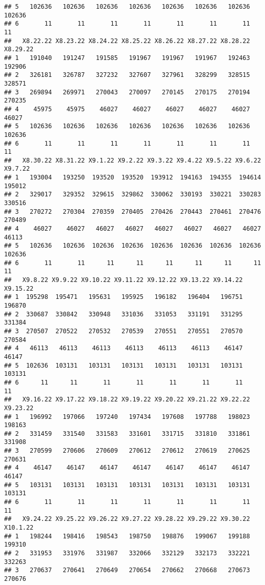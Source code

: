 \documentclass[
]{article}
\begin{document}
\begin{verbatim}
## 5   102636   102636   102636   102636   102636   102636   102636   102636
## 6       11       11       11       11       11       11       11       11
##   X8.22.22 X8.23.22 X8.24.22 X8.25.22 X8.26.22 X8.27.22 X8.28.22 X8.29.22
## 1   191040   191247   191585   191967   191967   191967   192463   192906
## 2   326181   326787   327232   327607   327961   328299   328515   328571
## 3   269894   269971   270043   270097   270145   270175   270194   270235
## 4    45975    45975    46027    46027    46027    46027    46027    46027
## 5   102636   102636   102636   102636   102636   102636   102636   102636
## 6       11       11       11       11       11       11       11       11
##   X8.30.22 X8.31.22 X9.1.22 X9.2.22 X9.3.22 X9.4.22 X9.5.22 X9.6.22 X9.7.22
## 1   193004   193250  193520  193520  193912  194163  194355  194614  195012
## 2   329017   329352  329615  329862  330062  330193  330221  330283  330516
## 3   270272   270304  270359  270405  270426  270443  270461  270476  270489
## 4    46027    46027   46027   46027   46027   46027   46027   46027   46113
## 5   102636   102636  102636  102636  102636  102636  102636  102636  102636
## 6       11       11      11      11      11      11      11      11      11
##   X9.8.22 X9.9.22 X9.10.22 X9.11.22 X9.12.22 X9.13.22 X9.14.22 X9.15.22
## 1  195298  195471   195631   195925   196182   196404   196751   196870
## 2  330687  330842   330948   331036   331053   331191   331295   331384
## 3  270507  270522   270532   270539   270551   270551   270570   270584
## 4   46113   46113    46113    46113    46113    46113    46147    46147
## 5  102636  103131   103131   103131   103131   103131   103131   103131
## 6      11      11       11       11       11       11       11       11
##   X9.16.22 X9.17.22 X9.18.22 X9.19.22 X9.20.22 X9.21.22 X9.22.22 X9.23.22
## 1   196992   197066   197240   197434   197608   197788   198023   198163
## 2   331459   331540   331583   331601   331715   331810   331861   331908
## 3   270599   270606   270609   270612   270612   270619   270625   270631
## 4    46147    46147    46147    46147    46147    46147    46147    46147
## 5   103131   103131   103131   103131   103131   103131   103131   103131
## 6       11       11       11       11       11       11       11       11
##   X9.24.22 X9.25.22 X9.26.22 X9.27.22 X9.28.22 X9.29.22 X9.30.22 X10.1.22
## 1   198244   198416   198543   198750   198876   199067   199188   199310
## 2   331953   331976   331987   332066   332129   332173   332221   332263
## 3   270637   270641   270649   270654   270662   270668   270673   270676

\end{verbatim}
\end{document}
